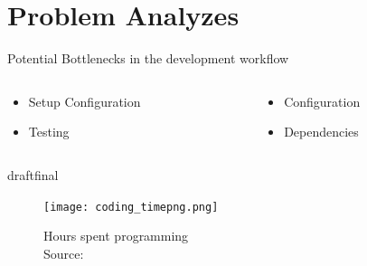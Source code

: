 \documentclass{beamer}
\def\final{final}
\def\status{draft}
\begin{document}
\section{Problem Analyzes}
\begin{frame}{}
  \begin{center}
    \large{\color{uos-red-full} Potential Bottlenecks in the development workflow}
    \normalsize
    \vspace{0.5cm}
    \begin{columns}[totalwidth=\textwidth]
      \begin{column}{0.4\textwidth}
        \begin{itemize}
          \item Setup Configuration
          \item Testing
        \end{itemize}
      \end{column}
      \begin{column}{0.4\textwidth}
        \begin{itemize}
          \item Configuration
          \item Dependencies
        \end{itemize}
      \end{column}
    \end{columns}
  \end{center}

  \ifx\status\final{}
    \pause{}
  \fi

  \begin{figure}
    \texttt{[image: coding\_timepng.png]}
    \caption{\footnotesize Hours spent programming \\\textcolor{uos-grey-full}{Source: {\cite{setuppain}}}}
  \end{figure}
\end{frame}

\end{document}
